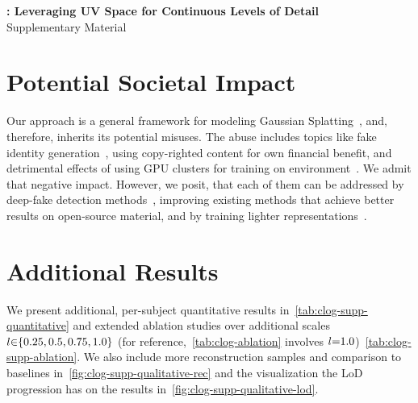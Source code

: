 \clearpage
{
  \vspace{2.0em}
  \centering
  \Large
  \textbf{\clog: Leveraging UV Space for Continuous Levels of Detail} \\
  \vspace{0.5em}
  Supplementary Material \\ \vspace{1.0em} }

\section{Potential Societal Impact} Our approach is a
  general framework for modeling Gaussian Splatting~\cite{kerbl20233d}, and,
  therefore, inherits its potential misuses.
  The abuse includes topics like fake identity
  generation~\cite{zhang2024e3gen}, using copy-righted content for own
  financial benefit, and detrimental effects of using GPU clusters for
  training on environment~\cite{bouza2023estimate}.
  We admit that negative impact.
  However, we posit, that each of them can be addressed by deep-fake detection
  methods~\cite{pei2024deepfake}, improving existing methods that achieve
  better results on open-source material, and by training lighter
  representations~\cite{lee2024compact,niedermayr2024compressed,fang2024mini}.

  
  
  
  
\section{Additional Results}
  We present additional, per-subject quantitative results
  in~\cref{tab:clog-supp-quantitative} and extended ablation studies over
  additional scales $l{\in}\{0.25, 0.5, 0.75, 1.0\}$ (for
  reference,~\cref{tab:clog-ablation} involves
  $l{=}1.0$)~\cref{tab:clog-supp-ablation}.
  We also include more reconstruction samples and comparison to baselines
  in~\cref{fig:clog-supp-qualitative-rec} and the visualization the LoD
  progression has on the results in~\cref{fig:clog-supp-qualitative-lod}.
